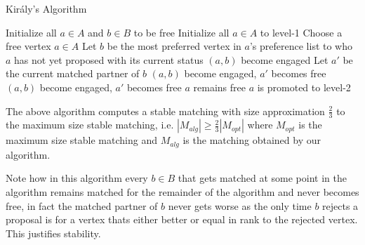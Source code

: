 \documentclass[a4paper,10pt]{article}
\theoremstyle{plain} %
\theoremstyle{plain} %
\begin{document}



\begin{algorithm}
\caption{Király's Algorithm}\label{alg:gale-shapley}
\begin{algorithmic}[1]

\State Initialize all $a\in A$ and $b\in B$ to be free
\State Initialize all $a\in A$ to level-1
\State Choose a free vertex $a \in A$
\State Let $b$ be the most preferred vertex in $a$'s preference list to who $a$ has not yet proposed with its current status
\State $(a, b)$ become engaged
\Else
\State Let $a'$ be the current matched partner of $b$
\State $(a, b)$ become engaged, $a'$ becomes free
\State $(a, b)$ become engaged, $a'$ becomes free
\EndIf
\Else
\State $a$ remains free
\State $a$ is promoted to level-2
\EndIf
\EndIf
\EndIf
\EndWhile
\EndProcedure

\end{algorithmic}
\end{algorithm}

The above algorithm computes a stable matching with size approximation $\frac{2}{3}$ to the maximum size stable matching, i.e. $|M_{alg}| \geq \frac{2}{3}|M_{opt}|$ where $M_{opt}$ is the maximum size stable matching and $M_{alg}$ is the matching obtained by our algorithm. 

Note how in this algorithm every $b \in B$ that gets matched at some point in the algorithm remains matched for the remainder of the algorithm and never becomes free, in fact the matched partner of $b$ never gets worse as the only time $b$ rejects a proposal is for a vertex thats either better or equal in rank to the rejected vertex. This justifies stability.
\end{document}

